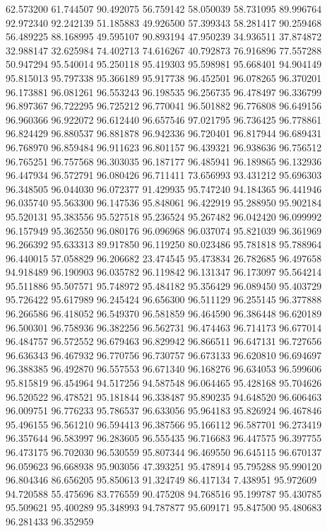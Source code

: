 62.573200
61.744507
90.492075
56.759142
58.050039
58.731095
89.996764
92.972340
92.242139
51.185883
49.926500
57.399343
58.281417
90.259468
56.489225
88.168995
49.595107
90.893194
47.950239
34.936511
37.874872
32.988147
32.625984
74.402713
74.616267
40.792873
76.916896
77.557288
50.947294
95.540014
95.250118
95.419303
95.598981
95.668401
94.904149
95.815013
95.797338
95.366189
95.917738
96.452501
96.078265
96.370201
96.173881
96.081261
96.553243
96.198535
96.256735
96.478497
96.336799
96.897367
96.722295
96.725212
96.770041
96.501882
96.776808
96.649156
96.960366
96.922072
96.612440
96.657546
97.021795
96.736425
96.778861
96.824429
96.880537
96.881878
96.942336
96.720401
96.817944
96.689431
96.768970
96.859484
96.911623
96.801157
96.439321
96.938636
96.756512
96.765251
96.757568
96.303035
96.187177
96.485941
96.189865
96.132936
96.447934
96.572791
96.080426
96.711411
73.656993
93.431212
95.696303
96.348505
96.044030
96.072377
91.429935
95.747240
94.184365
96.441946
96.035740
95.563300
96.147536
95.848061
96.422919
95.288950
95.902184
95.520131
95.383556
95.527518
95.236524
95.267482
96.042420
96.099992
96.157949
95.362550
96.080176
96.096968
96.037074
95.821039
96.361969
96.266392
95.633313
89.917850
96.119250
80.023486
95.781818
95.788964
96.440015
57.058829
96.206682
23.474545
95.473834
26.782685
96.497658
94.918489
96.190903
96.035782
96.119842
96.131347
96.173097
95.564214
95.511886
95.507571
95.748972
95.484182
95.356429
96.089450
95.403729
95.726422
95.617989
96.245424
96.656300
96.511129
96.255145
96.377888
96.266586
96.418052
96.549370
96.581859
96.464590
96.386448
96.620189
96.500301
96.758936
96.382256
96.562731
96.474463
96.714173
96.677014
96.484757
96.572552
96.679463
96.829942
96.866511
96.647131
96.727656
96.636343
96.467932
96.770756
96.730757
96.673133
96.620810
96.694697
96.388385
96.492870
96.557553
96.671340
96.168276
96.634053
96.599606
95.815819
96.454964
94.517256
94.587548
96.064465
95.428168
95.704626
96.520522
96.478521
95.181844
96.338487
95.890235
94.648520
96.606463
96.009751
96.776233
95.786537
96.633056
95.964183
95.826924
96.467846
95.496155
96.561210
96.594413
96.387566
95.166112
96.587701
96.273419
96.357644
96.583997
96.283605
96.555435
96.716683
96.447575
96.397755
96.473175
96.702030
96.530559
95.807344
96.469550
96.645115
96.670137
96.059623
96.668938
95.903056
47.393251
95.478914
95.795288
95.990120
96.804346
86.656205
95.850613
91.324749
86.417134
7.438951
95.972609
94.720588
55.475696
83.776559
90.475208
94.768516
95.199787
95.430785
95.509621
95.400289
95.348993
94.787877
95.609171
95.847500
95.480683
96.281433
96.352959
